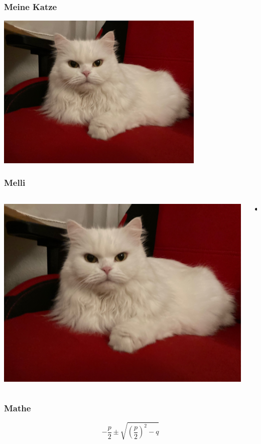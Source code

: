 \documentclass{beamer}
\begin{document}
\begin{frame}
\frametitle{Meine Katze}

\begin{center}
\includegraphics[width=0.75\textwidth]{Bilder/Katze}
\end{center}

\end{frame}

\begin{frame}
\frametitle{Melli}

\begin{columns}

\begin{column}{0.33\textwidth}
\begin{center}
\includegraphics[width=\textwidth]{Bilder/Katze}
\end{center}
\end{column}
\begin{column}{0.66\textwidth}
\begin{itemize}
	\item {\tiny\blindtext }
\end{itemize}
\end{column}

\end{columns}

\end{frame}

\begin{frame}
\frametitle{Mathe}

\begin{equation}
-\frac{p}{2}\pm \sqrt{\left(\frac{p}{2} \right)^2-q}
\end{equation}

\end{frame}
\end{document}
